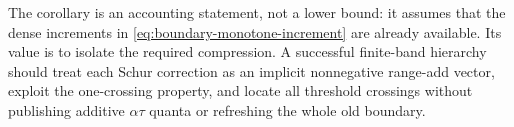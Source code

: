 The corollary is an accounting statement, not a lower bound: it assumes that
the dense increments in \cref{eq:boundary-monotone-increment} are already
available.  Its value is to isolate the required compression.  A successful
finite-band hierarchy should treat each Schur correction as an implicit
nonnegative range-add vector, exploit the one-crossing property, and locate
all threshold crossings without publishing additive $\alpha\tau$ quanta or
refreshing the whole old boundary.
